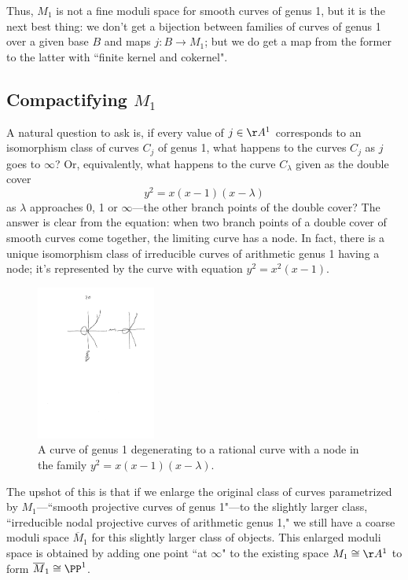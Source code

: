 Thus, $M_1$ is not a fine moduli space for smooth curves of genus 1, but it is the next best thing: we don't get a bijection between families of curves of genus 1 over a given base $B$ and maps $j : B \to M_1$; but we do get a map from the former to the latter with ``finite kernel and cokernel".

\subsection{Compactifying $M_1$}

A natural question to ask is, if every value of $j \in \AA^1$ corresponds to an isomorphism class of curves $C_j$ of genus 1, what happens to the curves $C_j$ as $j$ goes to $\infty$? Or, equivalently, what happens to the curve $C_\lambda$ given as the double cover
$$
y^2 = x(x-1)(x - \lambda)
$$
as $\lambda$ approaches 0, 1 or $\infty$---the other branch points of the double cover? The answer is clear from the equation: when two branch points of a double cover of smooth curves come together, the limiting curve has a node. In fact, there is a unique isomorphism class of irreducible curves of arithmetic genus 1 having a node; it's represented by the curve with equation $y^2=x^2(x-1)$.

\begin{figure}\label{Fig7.0}
\centerline {\includegraphics[height=2in]{"Fig7.0.pdf"}}
\caption{A curve of genus 1 degenerating to a rational curve with a node
in the family $y^2 = x(x-1)(x - \lambda)$.}
\label{default}
\end{figure}


The upshot of this is that if we enlarge the original class of curves parametrized by $M_1$---``smooth projective curves of genus 1"---to the slightly larger class, ``irreducible nodal projective curves of arithmetic genus 1," we still have a coarse moduli space $\overline M_1$ for this slightly larger class of objects. This enlarged moduli space is obtained by adding one point ``at $\infty$" to the existing space $M_1 \cong \AA^1$ to form $\overline M_1 \cong \PP^1$.

